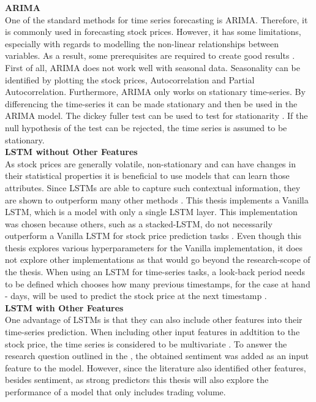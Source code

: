 \documentclass[11pt, a4paper]{article}
\begin{document}
\noindent\textbf{ARIMA}\\
One of the standard methods for time series forecasting is ARIMA. Therefore, it is commonly used in forecasting stock prices.
However, it has some limitations, especially with regards to modelling the non-linear relationships between variables. As a result,
some prerequisites are required to create good results \citep{sima2018timeseries}.
First of all, ARIMA does not work well with seasonal data. Seasonality can be identified by plotting the stock prices, Autocorrelation and Partial Autocorrelation.
Furthermore, ARIMA only works on stationary time-series. 
By differencing the time-series it can be made stationary and then be used in the ARIMA model.
The dickey fuller test can be used to test for stationarity \citep{jain2017ASO}.
If the null hypothesis of the test can be rejected, the time series is assumed to be stationary. \\

\noindent\textbf{LSTM without Other Features}\\
As stock prices are generally volatile, non-stationary and can have changes in their statistical properties it is beneficial to use
models that can learn those attributes. Since LSTMs are able to capture such contextual information, they are shown to outperform many other methods \citep{preeti2019lstm}.
This thesis implements a Vanilla LSTM, which is a model with only a single LSTM layer. This implementation was chosen because others, such as a stacked-LSTM, do not necessarily outperform a Vanilla LSTM for stock price prediction tasks \citep{hai2020lstms}.
Even though this thesis explores various hyperparameters for the Vanilla implementation, it does not explore other implementations as that would go
beyond the research-scope of the thesis.
When using an LSTM for time-series tasks, a look-back period needs to be defined which chooses how many previous timestamps, for the case at hand - days, will be used to predict the 
stock price at the next timestamp \citep{lim2020lookback}.\\

\noindent\textbf{LSTM with Other Features}\\
One advantage of LSTMs is that they can also include other features into their time-series prediction.
When including other input features in addtition to the stock price, the time series is considered to be multivariate \citep{liu2019multivariate}.
To answer the research question outlined in the , the obtained sentiment was added as an input feature to the model. However, since the literature
also identified other features, besides sentiment, as strong predictors this thesis will also explore the performance of a model that only includes trading volume.
\end{document}

